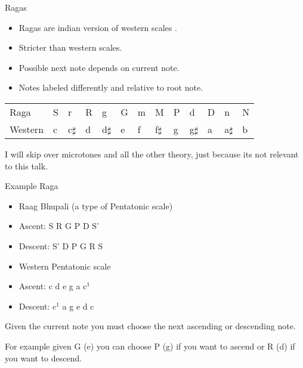 \documentclass[10pt]{beamer}
\begin{document}
\begin{frame}{Ragas}


\begin{itemize}
\item Ragas are indian version of western scales \cite{Raga2011}.
\item Stricter than western scales.
\item Possible next note depends on current note.
\item Notes labeled differently and relative to root note.
\end{itemize}
\begin{center}
\begin{tabular}{l|llllllllllll}
Raga & S & r & R & g & G & m & M & P & d & D & n & N \\
Western & c & c$\sharp$ & d & d$\sharp$ & e & f & f$\sharp$ & g & g$\sharp$ & a & a$\sharp$ & b \\
\end{tabular}
\end{center}
I will skip over microtones and all the other theory, just because its not relevant to this talk.
\end{frame}

\begin{frame}{Example Raga}


\begin{itemize}
\item Raag Bhupali (a type of Pentatonic scale)
\item Ascent: S R G P D S'
\item Descent: S' D P G R S
\end{itemize}
\begin{itemize}
\item Western Pentatonic scale
\item Ascent: c d e g a c$^{1}$
\item Descent: c$^{1}$ a g e d c
\end{itemize}

Given the current note you must choose the next ascending or descending note.

For example given G (e) you can choose P (g) if you want to ascend or R (d) if you want to descend.
\end{frame}
\end{document}
